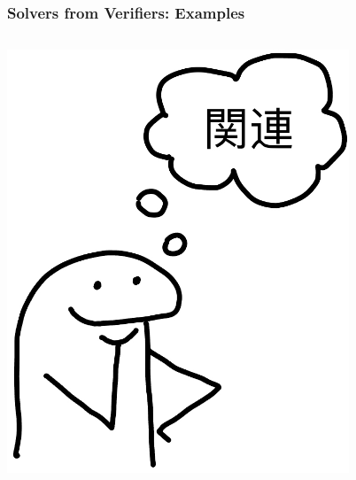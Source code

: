 \documentclass[xcolor={dvipsnames}, aspectratio=169]{beamer}
\begin{document}
\begin{frame}[fragile]
  \frametitle{Solvers from Verifiers: Examples}
  \begin{columns}    
    \begin{column}{0.35\textwidth}
      \centering
      \includegraphics[width=0.8\textwidth]{pic/kanren.jpg}
    \end{column}
    \begin{column}{0.75\textwidth} 

    \end{column}
  \end{columns}
\end{frame}
\end{document}
